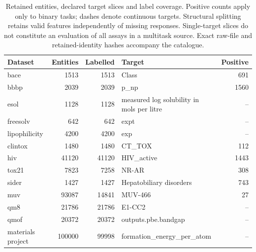 \begin{table}[htbp]\centering\small
\begin{tabular}{lrrp{2.5in}r}
\toprule
Dataset & Entities & Labelled & Target & Positive \\
\midrule
bace & 1513 & 1513 & Class & 691 \\
bbbp & 2039 & 2039 & p\_np & 1560 \\
esol & 1128 & 1128 & measured log solubility in mols per litre & -- \\
freesolv & 642 & 642 & expt & -- \\
lipophilicity & 4200 & 4200 & exp & -- \\
clintox & 1480 & 1480 & CT\_TOX & 112 \\
hiv & 41120 & 41120 & HIV\_active & 1443 \\
tox21 & 7823 & 7258 & NR-AR & 308 \\
sider & 1427 & 1427 & Hepatobiliary disorders & 743 \\
muv & 93087 & 14841 & MUV-466 & 27 \\
qm8 & 21786 & 21786 & E1-CC2 & -- \\
qmof & 20372 & 20372 & outputs.pbe.bandgap & -- \\
materials project & 100000 & 99998 & formation\_energy\_per\_atom & -- \\
\bottomrule
\end{tabular}
\caption{Retained entities, declared target slices and label coverage. Positive counts apply only to binary tasks; dashes denote continuous targets. Structural splitting retains valid features independently of missing responses. Single-target slices do not constitute an evaluation of all assays in a multitask source. Exact raw-file and retained-identity hashes accompany the catalogue.}\end{table}

